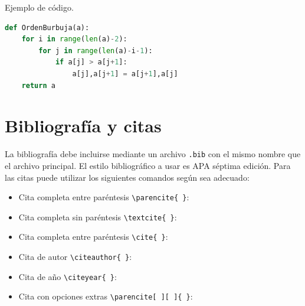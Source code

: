 \documentclass[11pt]{article}
\begin{document}
Ejemplo de código.

\begin{lstlisting}[language=Python,caption={Ejemplo de código.},captionpos=b]
def OrdenBurbuja(a):
    for i in range(len(a)-2):
        for j in range(len(a)-i-1):
            if a[j] > a[j+1]:
                a[j],a[j+1] = a[j+1],a[j]
    return a
\end{lstlisting}

\section{Bibliografía y citas}

La bibliografía debe incluirse mediante un archivo \texttt{.bib} con el mismo nombre que el archivo principal. El estilo bibliográfico a usar es APA séptima edición. Para las citas puede utilizar los siguientes comandos según sea adecuado:
\begin{itemize}
\item 
    Cita completa entre paréntesis \verb"\parencite{ }": \parencite{Bib06}
\item
    Cita completa sin paréntesis \verb"\textcite{ }": \textcite{Bib06}
\item 
    Cita completa entre paréntesis \verb"\cite{ }": \cite{Bib06}
\item
    Cita de autor \verb"\citeauthor{ }": \citeauthor{Bib06}
\item
    Cita de año \verb"\citeyear{ }": \citeyear{Bib06}
\item 
    Cita con opciones extras \verb"\parencite[ ][ ]{ }": \parencite[ver][pág. 66]{Bib06}
\end{itemize}


\nocite{*}
\printbibliography
\end{document}
